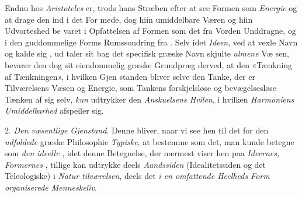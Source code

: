 Endnu hos \emph{Aristoteles} er, trods hans Stræben efter at
see Formen som \emph{Energie} og at drage den ind i det For\-%
mede, dog hiin umiddelbare Væren og hiin Udvorteshed be\-%
varet i Opfattelsen af Formen som det fra Vorden Unddragne,
og i den guddommelige Forms Rumssondring fra .
Selv idet \emph{Ideen}, ved at vexle Navn og kalde sig , ud\-%
taler sit bag det specifisk græske Navn skjulte \emph{almene} Væ\-%
sen, bevarer den dog sit eiendommelig græske Grundpræg
derved, at den «Tænkning af Tænkningen», i hvilken Gjen\-%
standen bliver selve den Tanke, der er Tilværelsens Væsen og
Energie, som Tankens forskjelsløse og bevægelsesløse Tænken
af sig selv, \emph{kun} udtrykker den \emph{Anskuelsens Hvilen}, i
hvilken \emph{Harmoniens Umiddelbarhed} afspeiler sig.

2. \emph{Den væsentlige Gjenstand}. Denne bliver, naar vi
see hen til det for den \emph{udfoldede} græske Philosophie \emph{Typiske},
at bestemme som det, man kunde betegne som \emph{den ideelle
}, idet denne Betegnelse, der nærmest viser hen paa
\emph{Ideernes, Formernes }, tillige kan udtrykke deels
\emph{Aandssiden} (Idealitetssiden og det Teleologiske) i \emph{Natur\-%
tilværelsen}, deels det \emph{i en omfattende Heelheds Form
organiserede Menneskeliv}.


